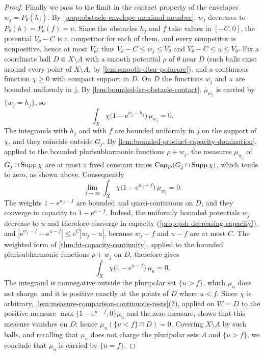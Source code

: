\begin{proof}
Finally we pass to the limit in the contact property of the envelopes $w_j=P_\theta(h_j)$. By \cref{prop:obstacle-envelope-maximal-member}, $w_j$ decreases to $P_\theta(h)=P_\theta(f)=u$. Since the obstacles $h_j$ and $f$ take values in $[-C,0]$, the potential $V_\theta-C$ is a competitor for each of them, and every competitor is nonpositive, hence at most $V_\theta$; thus $V_\theta-C\leq w_j\leq V_\theta$ and $V_\theta-C\leq u\leq V_\theta$. Fix a coordinate ball $D\Subset X\setminus A$ with a smooth potential $\rho$ of $\theta$ near $\overline D$ (such balls exist around every point of $X\setminus A$, by \cref{lem:smooth-dbar-poincare}), and a continuous function $\chi\geq0$ with compact support in $D$. On $D$ the functions $w_j$ and $u$ are bounded uniformly in $j$. By \cref{lem:bounded-lsc-obstacle-contact}, $\mu_{w_j}$ is carried by $\{w_j=h_j\}$, so
\[
 \int_X\chi\bigl(1-\mathrm e^{w_j-h_j}\bigr)\,\mu_{w_j}=0.
\]
The integrands with $h_j$ and with $f$ are bounded uniformly in $j$ on the support of $\chi$, and they coincide outside $G_j$. By \cref{lem:bounded-product-capacity-domination}, applied to the bounded plurisubharmonic functions $\rho+w_j$, the measures $\mu_{w_j}$ of $G_j\cap\operatorname{Supp}\chi$ are at most a fixed constant times $\operatorname{Cap}_D(G_j\cap\operatorname{Supp}\chi)$, which tends to zero, as shown above. Consequently
\[
 \lim_{j\to\infty}\int_X\chi\bigl(1-\mathrm e^{w_j-f}\bigr)\,\mu_{w_j}=0.
\]
The weights $1-\mathrm e^{w_j-f}$ are bounded and quasi-continuous on $D$, and they converge in capacity to $1-\mathrm e^{u-f}$. Indeed, the uniformly bounded potentials $w_j$ decrease to $u$ and therefore converge in capacity (\cref{prop:psh-decreasing-capacity}), and $|\mathrm e^{w_j-f}-\mathrm e^{u-f}|\leq\mathrm e^{C}|w_j-u|$, because $w_j-f$ and $u-f$ are at most $C$. The weighted form of \cref{thm:bt-capacity-continuity}, applied to the bounded plurisubharmonic functions $\rho+w_j$ on $D$, therefore gives
\[
 \int_X\chi\bigl(1-\mathrm e^{u-f}\bigr)\,\mu_u=0.
\]
The integrand is nonnegative outside the pluripolar set $\{u>f\}$, which $\mu_u$ does not charge, and it is positive exactly at the points of $D$ where $u<f$. Since $\chi$ is arbitrary, \cref{lem:measure-comparison-continuous-tests}(2), applied on $W=D$ to the positive measure $\max\{1-\mathrm e^{u-f},0\}\mu_u$ and the zero measure, shows that this measure vanishes on $D$; hence $\mu_u(\{u<f\}\cap D)=0$. Covering $X\setminus A$ by such balls, and recalling that $\mu_u$ does not charge the pluripolar sets $A$ and $\{u>f\}$, we conclude that $\mu_u$ is carried by $\{u=f\}$.


\end{proof}
